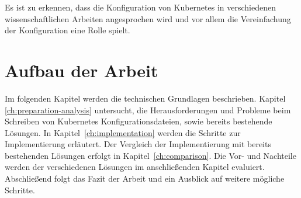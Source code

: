Es ist zu erkennen, dass die Konfiguration von Kubernetes in verschiedenen wissenschaftlichen Arbeiten angesprochen wird und vor allem die Vereinfachung
der Konfiguration eine Rolle spielt.

\section{Aufbau der Arbeit}
Im folgenden Kapitel werden die technischen Grundlagen beschrieben.
Kapitel \ref{ch:preparation-analysis} untersucht, die Herausforderungen und Probleme beim Schreiben von Kubernetes Konfigurationsdateien, sowie bereits bestehende Lösungen.
In Kapitel~\ref{ch:implementation} werden die Schritte zur Implementierung erläutert.
Der Vergleich der Implementierung mit bereits bestehenden Lösungen erfolgt in Kapitel~\ref{ch:comparison}.
Die Vor- und Nachteile werden der verschiedenen Lösungen im anschließenden Kapitel evaluiert.
Abschließend folgt das Fazit der Arbeit und ein Ausblick auf weitere mögliche Schritte.
